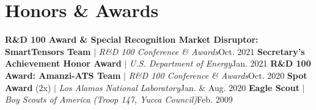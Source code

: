 \section{Honors \& Awards}
    \resumeSubHeadingListStart
      \resumeProjectHeading
          {\textbf{R\&D 100 Award \& Special Recognition Market Disruptor: SmartTensors Team} $|$ \emph{R\&D 100 Conference \& Awards}}{Oct. 2021}
      \resumeProjectHeading
          {\textbf{Secretary's Achievement Honor Award} $|$ \emph{U.S. Department of Energy}}{Jan. 2021}
      \resumeProjectHeading
          {\textbf{R\&D 100 Award: Amanzi-ATS Team} $|$ \emph{R\&D 100 Conference \& Awards}}{Oct. 2020}
      \resumeProjectHeading
          {\textbf{Spot Award} (2x) $|$ \emph{Los Alamos National Laboratory}}{Jan. \& Aug. 2020}
      \resumeProjectHeading
          {\textbf{Eagle Scout} $|$ \emph{Boy Scouts of America (Troop 147, Yucca Council)}}{Feb. 2009}
    \resumeSubHeadingListEnd
